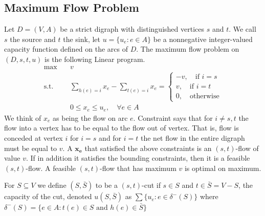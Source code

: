             \subsection{Maximum Flow Problem}
                Let $D=(V, A)$ be a strict digraph with distinguished vertices $s$ and $t$. We call $s$ the source and $t$ the sink, let $u=\{u_e: e\in A\}$ be a nonnegative integer-valued capacity function defined on the arcs of $D$. The maximum flow problem on $(D, s, t, u)$ is the following Linear program.
                \begin{align*}
                    \max \quad & v\\
                    \text{s.t.} \quad & \sum_{h(e)=i}x_e - \sum_{t(e) = i} x_e = \begin{cases}
                        -v, \quad \text{if } i = s\\
                        v, \quad \text{if } i = t \\
                        0, \quad \text{otherwise}
                    \end{cases}\\
                    & 0\le x_e \le u_e, \quad \forall e\in A
                \end{align*}
                We think of $x_e$ as being the flow on arc $e$. Constraint says that for $i \neq s, t$ the flow into a vertex has to be equal to the flow out of vertex. That is, flow is conceded at vertex $i$ for $i=s$ and for $i=t$ the net flow in the entire digraph must be equal to $v$. A $\mathbf{x_e}$ that satisfied the above constraints is an $(s,t)$-flow of value $v$. If in addition it satisfies the bounding constraints, then it is a feasible $(s,t)$-flow. A feasible $(s,t)$-flow that has maximum $v$ is optimal on maximum.

                \begin{theorem}
                    For $S \subseteq V$ we define $(S, \bar{S})$ to be a $(s, t)$-cut if $s\in S$ and $t\in \bar{S}=V-S$, the capacity of the cut, denoted $u(S, \bar{S})$ as $\sum \{u_e: e\in \delta^-(S)\}$ where $\delta^-(S) = \{e\in A: t(e) \in S \text{ and } h(e) \in \bar{S}\}$
                \end{theorem}

